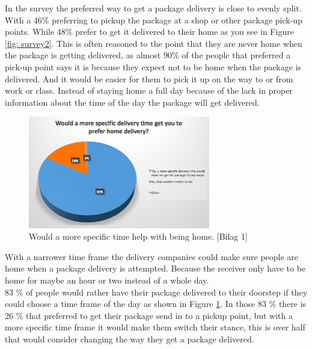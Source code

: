 \documentclass[12pt]{report}
\begin{document}
In the survey the preferred way to get a package delivery is close to evenly split. With a 46\% preferring to pickup the package at a shop or other package pick-up points. While 48\% prefer to get it delivered to their home as you see in Figure \ref{fig: survey2}. 
This is often reasoned to the point that they are never home when the package is getting delivered, as almost 90\% of the people that preferred a pick-up point says it is because they expect not to be home when the package is delivered. And it would be easier for them to pick it up on the way to or from work or class. Instead of staying home a full day because of the lack in proper information about the time of the day the package will get delivered.


\begin{figure}[H]
  \centering
  \includegraphics[width=300]{pics/morespecific.png}
  \caption{Would a more specific time help with being home. [Bilag 1]}
  \label{fig: survey3}
\end{figure}

 With a narrower time frame the delivery companies could make sure people are home when a package delivery is attempted. Because the receiver only have to be home for maybe an hour or two instead of a whole day.\\\hspace*{5 mm}
 83 \% of people would rather have their package delivered to their doorstep if they could choose a time frame of the day as shown in Figure \ref{fig: survey3}.
 In those 83 \% there is 26 \% that preferred to get their package send in to a pickup point, but with a more specific time frame it would make them switch their stance, this is over half that would consider changing the way they get a package delivered. \\
\end{document}
